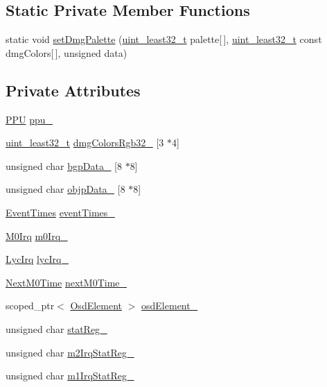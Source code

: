 \subsection*{Static Private Member Functions}
\begin{DoxyCompactItemize}
\item 
static void \hyperlink{classgambatte_1_1LCD_a27c9be6c44120651147cfbf1f549bf82}{set\+Dmg\+Palette} (\hyperlink{namespacegambatte_a0639f09fccfbbd5a8e0796318768e370}{uint\+\_\+least32\+\_\+t} palette\mbox{[}$\,$\mbox{]}, \hyperlink{namespacegambatte_a0639f09fccfbbd5a8e0796318768e370}{uint\+\_\+least32\+\_\+t} const dmg\+Colors\mbox{[}$\,$\mbox{]}, unsigned data)
\end{DoxyCompactItemize}
\subsection*{Private Attributes}
\begin{DoxyCompactItemize}
\item 
\hyperlink{classgambatte_1_1PPU}{P\+PU} \hyperlink{classgambatte_1_1LCD_a1770d8d98ab12e61affb96d0f0a5c8ba}{ppu\+\_\+}
\item 
\hyperlink{namespacegambatte_a0639f09fccfbbd5a8e0796318768e370}{uint\+\_\+least32\+\_\+t} \hyperlink{classgambatte_1_1LCD_ac4a69658ae9a043eca86a957ddab5fee}{dmg\+Colors\+Rgb32\+\_\+} \mbox{[}3 $\ast$4\mbox{]}
\item 
unsigned char \hyperlink{classgambatte_1_1LCD_a78e6e16a615134815175455f62cfc7d6}{bgp\+Data\+\_\+} \mbox{[}8 $\ast$8\mbox{]}
\item 
unsigned char \hyperlink{classgambatte_1_1LCD_aa54d4e84e493df961b5e481bdc608d74}{objp\+Data\+\_\+} \mbox{[}8 $\ast$8\mbox{]}
\item 
\hyperlink{classgambatte_1_1LCD_1_1EventTimes}{Event\+Times} \hyperlink{classgambatte_1_1LCD_a0305cd5bf767a2148d61e58b142b65af}{event\+Times\+\_\+}
\item 
\hyperlink{classgambatte_1_1M0Irq}{M0\+Irq} \hyperlink{classgambatte_1_1LCD_a08457da7b34a6e02809b9afaa2615d14}{m0\+Irq\+\_\+}
\item 
\hyperlink{classgambatte_1_1LycIrq}{Lyc\+Irq} \hyperlink{classgambatte_1_1LCD_a3d83c3d85e927621febe83eb9d1ee091}{lyc\+Irq\+\_\+}
\item 
\hyperlink{classgambatte_1_1NextM0Time}{Next\+M0\+Time} \hyperlink{classgambatte_1_1LCD_a796d00de70e91abedbaeab0c8f58b6ca}{next\+M0\+Time\+\_\+}
\item 
scoped\+\_\+ptr$<$ \hyperlink{classgambatte_1_1OsdElement}{Osd\+Element} $>$ \hyperlink{classgambatte_1_1LCD_ad599f47c700666bb90eb82de65ddf001}{osd\+Element\+\_\+}
\item 
unsigned char \hyperlink{classgambatte_1_1LCD_abd5eea9ae2434ca551ce201c22ff4b21}{stat\+Reg\+\_\+}
\item 
unsigned char \hyperlink{classgambatte_1_1LCD_a76de56d2da31e54b5debffa1139a33c8}{m2\+Irq\+Stat\+Reg\+\_\+}
\item 
unsigned char \hyperlink{classgambatte_1_1LCD_a5ceaef8bb473fa797f3257caf43f55e0}{m1\+Irq\+Stat\+Reg\+\_\+}
\end{DoxyCompactItemize}


